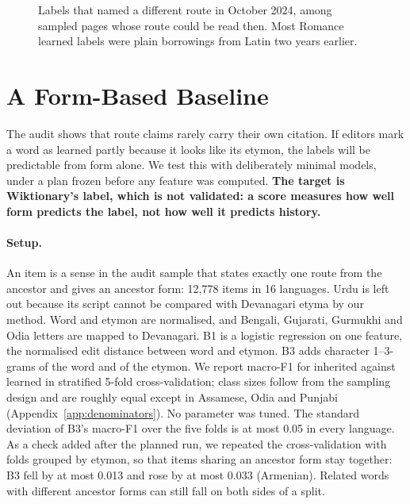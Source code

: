 \documentclass[11pt]{article}
\begin{document}
\begin{figure}[t]
\centering
{}
\caption{Labels that named a different route in October 2024, among sampled pages whose route could be read then. Most Romance learned labels were plain borrowings from Latin two years earlier.}
\label{fig:history}
\end{figure}

\section{A Form-Based Baseline}
\label{sec:baseline}

The audit shows that route claims rarely carry their own citation. If editors mark a word as learned partly because it looks like its etymon, the labels will be predictable from form alone. We test this with deliberately minimal models, under a plan frozen before any feature was computed. \textbf{The target is Wiktionary's label, which is not validated: a score measures how well form predicts the label, not how well it predicts history.}

\paragraph{Setup.} An item is a sense in the audit sample that states exactly one route from the ancestor and gives an ancestor form: 12,778 items in 16 languages. Urdu is left out because its script cannot be compared with Devanagari etyma by our method. Word and etymon are normalised, and Bengali, Gujarati, Gurmukhi and Odia letters are mapped to Devanagari. B1 is a logistic regression on one feature, the normalised edit distance between word and etymon. B3 adds character 1--3-grams of the word and of the etymon. We report macro-F1 for inherited against learned in stratified 5-fold cross-validation; class sizes follow from the sampling design and are roughly equal except in Assamese, Odia and Punjabi (Appendix~\ref{app:denominators}). No parameter was tuned. The standard deviation of B3's macro-F1 over the five folds is at most 0.05 in every language. As a check added after the planned run, we repeated the cross-validation with folds grouped by etymon, so that items sharing an ancestor form stay together: B3 fell by at most 0.013 and rose by at most 0.033 (Armenian). Related words with different ancestor forms can still fall on both sides of a split.
\end{document}
